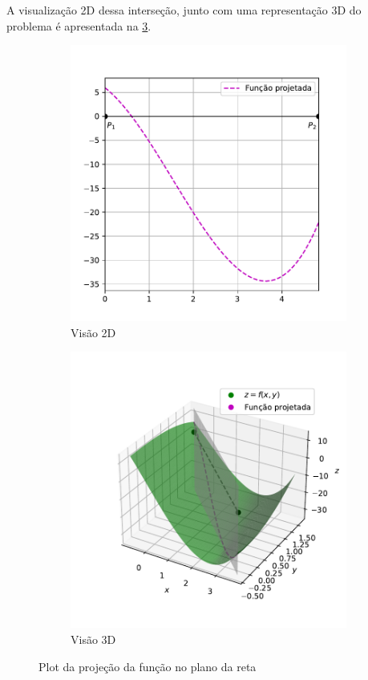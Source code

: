 \documentclass[10pt, a4paper]{article}
\begin{document}
A visualização 2D dessa interseção, junto com uma representação 3D do problema é apresentada na \cref{fig:q4}.


\begin{figure}
    \centering
    \begin{subfigure}[b]{0.45\textwidth}
        \centering
        \includegraphics[width=\textwidth]{images/q4_1.pdf}
        \caption{Visão 2D}
        \label{fig:q4_1}
    \end{subfigure}
    \hfill
    \begin{subfigure}[b]{0.5\textwidth}
        \centering
        \includegraphics[width=\textwidth]{images/q4_2.pdf}
        \caption{Visão 3D}
        \label{fig:q4_2}
    \end{subfigure}
    \hfill
       \caption{Plot da projeção da função no plano da reta}
       \label{fig:q4}
\end{figure}



\end{document}
